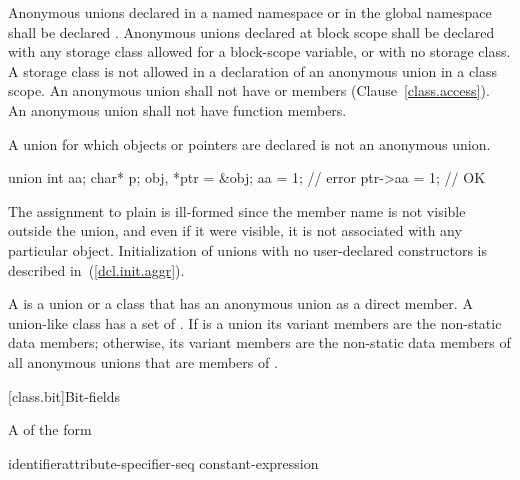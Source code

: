 \pnum
{}%
%
Anonymous unions declared in a named namespace or in the global
namespace shall be declared . Anonymous unions declared at
block scope shall be declared with any storage class allowed for a
block-scope variable, or with no storage class. A storage class is not
allowed in a declaration of an anonymous union in a class scope.
%
%
An anonymous union shall not have  or 
members (Clause~\ref{class.access}). An anonymous union shall not have
function members.

\pnum
A union for which objects or pointers are declared is not an anonymous union.
\enterexample

\begin{codeblock}
union { int aa; char* p; } obj, *ptr = &obj;
aa = 1;                         // error
ptr->aa = 1;                    // OK
\end{codeblock}

The assignment to plain  is ill-formed since the member name
is not visible outside the union, and even if it were visible, it is not
associated with any particular object.
\exitexample
\enternote
Initialization of unions with no user-declared constructors is described
in~(\ref{dcl.init.aggr}).
\exitnote

\pnum
A  is a union or a class that has an anonymous union as a direct member. A union-like class  has a set of . If  is a union its variant members are the non-static data members; otherwise, its variant members are the non-static data members of all anonymous unions that are members of .

[class.bit]{Bit-fields}%

\pnum
A  of the form

\begin{ncbnftab}
identifier\opt  attribute-specifier-seq\opt \terminal{:} constant-expression
\end{ncbnftab}

